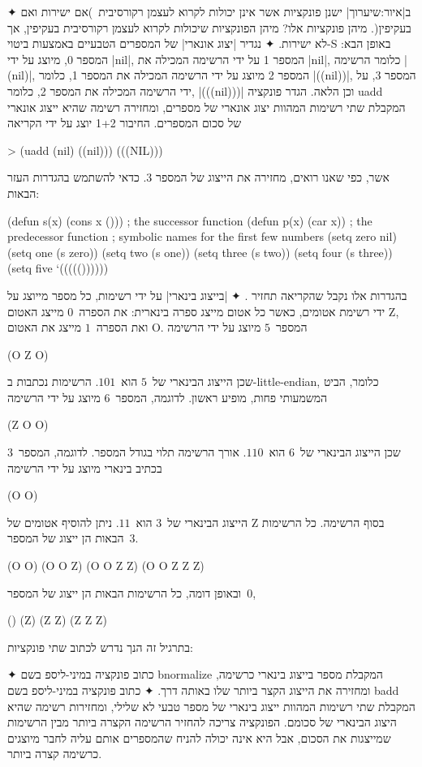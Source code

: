 \begin{enumerate}
✦ ב|איור:שיערוך| ישנן פונקציות אשר אינן יכולות לקרוא לעצמן
רקורסיבית~)אם ישירות ואם בעקיפין(. מיהן פונקציות אלו? מיהן
הפונקציות שיכולות לקרוא לעצמן רקורסיבית בעקיפין, אך לא ישירות.
✦ נגדיר
\ע|יצוג אונארי| של המספרים הטבעיים באמצעות ביטוי-S באופן הבא: המספר
0,
מיוצג על ידי \E|nil|, המספר 1 על ידי הרשימה המכילה את \E|nil|, כלומר הרשימה
\E|(nil)|, המספר 2 מיוצג על ידי הרשימה המכילה את המספר 1, כלומר \E|((nil))|,
המספר 3, על ידי הרשימה המכילה את המספר 2, כלומר, \E|(((nil)))| וכן הלאה.
הגדר פונקציה uadd המקבלת שתי רשימות המהוות יצוג אונארי של מספרים, ומחזירה
רשימה שהיא ייצוג אונארי של סכום המספרים. החיבור 1+2 יוצג על ידי הקריאה
\begin{LISP}
> (uadd (nil) ((nil)))
(((NIL)))
\end{LISP}
אשר, כפי שאנו רואים, מחזירה את הייצוג של המספר 3.
כדאי להשתמש בהגדרות העזר הבאות:
\begin{LISP}
(defun s(x) (cons x ())) ; the successor function
(defun p(x) (car x)) ; the predecessor function
; symbolic names for the first few numbers
(setq zero nil)
(setq one (s zero))
(setq two (s one))
(setq three (s two))
(setq four (s three))
(setq five ‘((((())))))
\end{LISP}
בהגדרות אלו נקבל שהקריאה
תחזיר \lisp{((((()))))}.
✦ \ע|בייצוג בינארי| על ידי רשימות, כל מספר מייוצג על ידי רשימת אטומים, כאשר כל
אטום מייצג ספרה בינארית: את הספרה~$0$ מייצג האטום Z, ואת הספרה~$1$ מייצג את
האטום O. המספר~$5$ מיוצג על ידי הרשימה \begin{LISP}
(O Z O)
\end{LISP} שכן הייצוג הבינארי של~$5$ הוא~$101$. הרשימות נכתבות ב-little-endian,
כלומר, הביט המשמעותי פחות, מופיע ראשון. לדוגמה, המספר~$6$ מיוצג על ידי הרשימה
\begin{LISP}
 (Z O O)
 \end{LISP} שכן הייצוג הבינארי של~$6$ הוא~$110$. אורך הרשימה תלוי בגודל המספר.
 לדוגמה, המספר~$3$ בכתיב בינארי מיוצג על ידי הרשימה \begin{LISP}
 (O O)
 \end{LISP} הייצוג הבינארי של~$3$ הוא~$11$. ניתן להוסיף אטומים של Z בסוף
 הרשימה. כל הרשימות הבאות הן ייצוג של המספר~$3$. \begin{LISP}
(O O)
(O O Z)
(O O Z Z)
(O O Z Z Z)
\end{LISP}
 ובאופן דומה, כל הרשימות הבאות הן ייצוג של המספר~$0$,
\begin{LISP}
()
(Z)
(Z Z)
(Z Z Z)
\end{LISP}
בתרגיל זה הנך נדרש לכתוב שתי פונקציות:
\begin{itemize}
    ✦ כתוב פונקציה במיני-ליספ בשם bnormalize המקבלת מספר בייצוג בינארי כרשימה,
    ומחזירה את הייצוג הקצר ביותר שלו באותה דרך.
     ✦ כתוב פונקציה במיני-ליספ בשם badd המקבלת שתי רשימות המהוות ייצוג בינארי
     של מספר טבעי לא שלילי, ומחזירות רשימה שהיא היצוג הבינארי של סכומם.
     הפונקציה צריכה להחזיר הרשימה הקצרה ביותר מבין הרשימות שמייצגות את הסכום,
     אבל היא אינה יכולה להניח שהמספרים אותם עליה לחבר מיוצגים כרשימה קצרה
     ביותר.
\end{itemize}
\end{enumerate}
